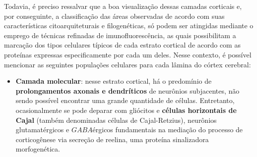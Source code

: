 \documentclass[
]{book}
\providecommand{\tightlist}{%
  \setlength{\itemsep}{0pt}\setlength{\parskip}{0pt}}
\begin{document}
Todavia, é preciso ressalvar que a boa visualização dessas camadas corticais e, por conseguinte, a classificação das áreas observadas de acordo com suas características citoarquiteturais e filogenéticas, só podem ser atingidas mediante o emprego de técnicas refinadas de imunofluorescência, as quais possibilitam a marcação dos tipos celulares típicos de cada estrato cortical de acordo com as proteínas expressas especificamente por cada um deles. Nesse contexto, é possível mencionar as seguintes populações celulares para cada lâmina do córtex cerebral:

\begin{itemize}
\tightlist
\item
  \textbf{Camada molecular}: nesse estrato cortical, há o predomínio de \textbf{prolongamentos axonais e dendríticos} de neurônios subjacentes, não sendo possível encontrar uma grande quantidade de células. Entretanto, ocasionalmente se pode deparar com gliócitos e \textbf{células horizontais de Cajal} (também denominadas células de Cajal-Retzius), neurônios glutamatérgicos e \(GABA\)érgicos fundamentais na mediação do processo de corticogênese via secreção de reelina, uma proteína sinalizadora morfogenética.
\end{itemize}
\end{document}
